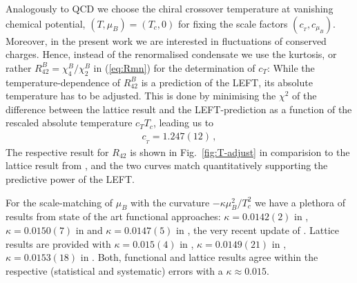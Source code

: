 \documentclass[%
reprint,
superscriptaddress,
showpacs,preprintnumbers,
amsmath,amssymb,
aps,
prd,
]{revtex4-1}
\def\Fig#1{Fig.~\ref{#1}} \def\Tab#1{Tab.~\ref{#1}}
\def\eq#1{(\ref{#1})}
\begin{document}
	Analogously to QCD we choose the chiral crossover temperature at vanishing chemical potential, $(T,\mu_B)=(T_c,0)$ for fixing the scale factors $(c_{_T}, c_{\mu_B})$. Moreover, in the present work we are interested in fluctuations of conserved charges. Hence, instead of the renormalised condensate we use the kurtosis, or rather $R_{42}^B=\chi_4^B/\chi_2^B$ in \eq{eq:Rmn} for the determination of $c_T$: While the temperature-dependence of $R^{B}_{42}$ is a prediction of the LEFT, its absolute temperature has to be adjusted. This is done by minimising the $\chi^2$ of the difference between the lattice result and the LEFT-prediction as a function of the rescaled absolute temperature $c_T T_c$, leading us to 
	\begin{align}
		c_{_{T}}=1.247(12)\,,\label{eq:c_T-LEFT}
	\end{align}
	The respective result for $R_{42}$ is shown in \Fig{fig:T-adjust} in comparision to the lattice result from \cite{Borsanyi:2018grb}, and the two curves match quantitatively supporting the predictive power of the LEFT. 
	
	For the scale-matching of $\mu_B$ with the curvature $-\kappa \mu_B^2/T_c^2$ we have a plethora of results from state of the art functional approaches: $\kappa=0.0142(2)$ in  \cite{Fu:2019hdw}, $\kappa=0.0150(7)$ in \cite{Gao:2020qsj} and $\kappa=0.0147(5)$ in \cite{Gao:2020fbl}, the very recent update of \cite{Gao:2020fbl}. Lattice results are provided with $\kappa=0.015(4)$ in \cite{Bazavov:2018mes}, $\kappa=0.0149(21)$ in \cite{Bellwied:2015rza}, $\kappa=0.0153(18)$ in \cite{Borsanyi:2020fev}. Both, functional and lattice results agree within the respective (statistical and systematic) errors with a $\kappa\approx 0.015$. 
	
\end{document}
